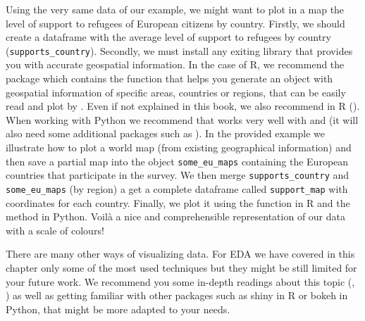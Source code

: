 Using the very same data of our example, we might want to plot in a map the level of support to refugees of European citizens by country. Firstly, we should create a dataframe with the average level of support to refugees by country (\texttt{supports\_country}). Secondly, we must install any exiting library that provides you with accurate geospatial information. In the case of R, we recommend the package  which contains the function  that helps you generate an object with geospatial information of specific areas, countries or regions, that can be easily read and plot by . Even if not explained in this book, we also recommend  in R (\cite{kahle2013ggmap}). When working with Python we recommend  that works very well with  and  (it will also need some additional packages such as ).  In the provided example we illustrate how to plot a world map (from existing geographical information) and then save a partial map into the object \texttt{some\_eu\_maps} containing the European countries that participate in the survey. We then merge \texttt{supports\_country} and \texttt{some\_eu\_maps} (by region) a get a complete dataframe called \texttt{support\_map} with coordinates for each country.  Finally, we plot it using the  function  in R and the  method  in Python. Voilà a nice and comprehensible representation of our data with a scale of colours!


There are many other ways of visualizing data. For EDA we have covered in this chapter only some of the most used techniques but they might be still limited for your future work. We recommend you some in-depth readings about this topic (\cite{tufte2006beautiful}, \cite{cairo2019charts}) as well as getting familiar with other packages such as shiny in R or bokeh in Python, that might be more adapted to your needs.
